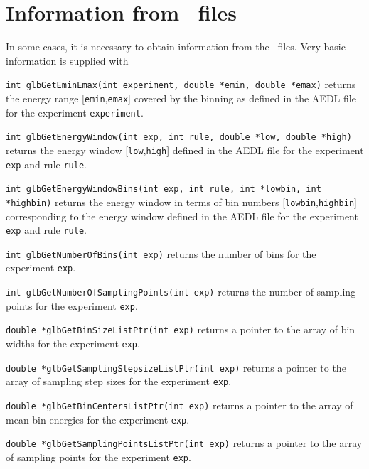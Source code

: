 \section{Information from \AEDL\ files}
\label{sec:aedl_names}

In some cases, it is necessary to obtain information from the \AEDL\
files. Very basic information is supplied with
\begin{function}
{\tt int glbGetEminEmax(int experiment, double *emin, double *emax)} returns the
energy range [{\tt emin},{\tt emax}] covered by the binning as defined in the AEDL file for the experiment
{\tt experiment}.
\end{function}
\begin{function}
{\tt int glbGetEnergyWindow(int exp, int rule, double *low, double *high)} returns the
energy window [{\tt low},{\tt high}] defined in the AEDL file for the experiment
{\tt exp} and rule {\tt rule}.
\end{function}
\begin{function}
{\tt int glbGetEnergyWindowBins(int exp, int rule, int *lowbin, int *highbin)} returns the
energy window in terms of bin numbers [{\tt lowbin},{\tt highbin}] corresponding to the energy window defined in the AEDL file for the experiment {\tt exp} and rule {\tt rule}.
\end{function}
\begin{function}
{\tt int glbGetNumberOfBins(int exp)} returns the number of bins for the experiment {\tt exp}.
\end{function}
\begin{function}
{\tt int glbGetNumberOfSamplingPoints(int exp)} returns the number of sampling points for the experiment {\tt exp}.
\end{function}
\begin{function}
{\tt double *glbGetBinSizeListPtr(int exp)} returns a pointer to the array of bin widths
for the experiment {\tt exp}.
\end{function}
\begin{function}
{\tt double *glbGetSamplingStepsizeListPtr(int exp)} returns a pointer to the array of
sampling step sizes for the experiment {\tt exp}.
\end{function}
\begin{function}
{\tt double *glbGetBinCentersListPtr(int exp)} returns a pointer to the array of
mean bin energies for the experiment {\tt exp}.
\end{function}
\begin{function}
{\tt double *glbGetSamplingPointsListPtr(int exp)} returns a pointer to the array of
sampling points for the experiment {\tt exp}.
\end{function}

